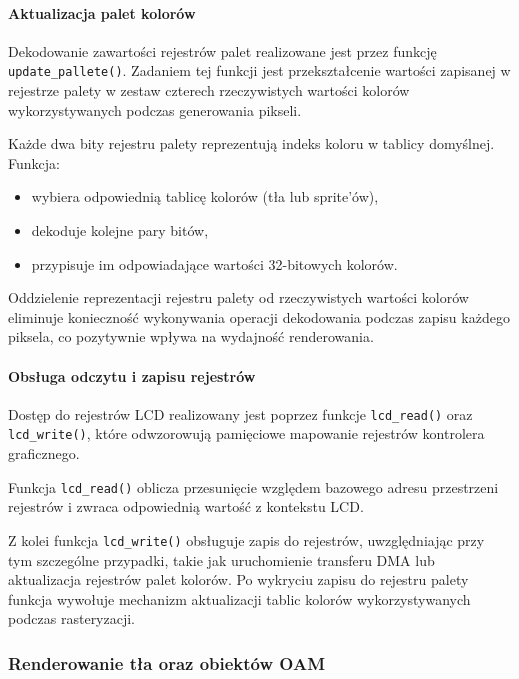 \documentclass{article}
\begin{document}
\paragraph{Aktualizacja palet kolorów}

Dekodowanie zawartości rejestrów palet realizowane jest przez funkcję \texttt{update\_pallete()}. Zadaniem tej funkcji jest przekształcenie wartości zapisanej w rejestrze palety w zestaw czterech rzeczywistych wartości kolorów wykorzystywanych podczas generowania pikseli.

Każde dwa bity rejestru palety reprezentują indeks koloru w tablicy domyślnej. Funkcja:

\begin{itemize}
	\item wybiera odpowiednią tablicę kolorów (tła lub sprite'ów),
	\item dekoduje kolejne pary bitów,
	\item przypisuje im odpowiadające wartości 32-bitowych kolorów.
\end{itemize}

Oddzielenie reprezentacji rejestru palety od rzeczywistych wartości kolorów eliminuje konieczność wykonywania operacji dekodowania podczas zapisu każdego piksela, co pozytywnie wpływa na wydajność renderowania.

\paragraph{Obsługa odczytu i zapisu rejestrów}

Dostęp do rejestrów LCD realizowany jest poprzez funkcje \texttt{lcd\_read()} oraz \texttt{lcd\_write()}, które odwzorowują pamięciowe mapowanie rejestrów kontrolera graficznego.

Funkcja \texttt{lcd\_read()} oblicza przesunięcie względem bazowego adresu przestrzeni rejestrów i zwraca odpowiednią wartość z kontekstu LCD. 

Z kolei funkcja \texttt{lcd\_write()} obsługuje zapis do rejestrów, uwzględniając przy tym szczególne przypadki, takie jak uruchomienie transferu DMA lub aktualizacja rejestrów palet kolorów. Po wykryciu zapisu do rejestru palety funkcja wywołuje mechanizm aktualizacji tablic kolorów wykorzystywanych podczas rasteryzacji.

\subsubsection{Renderowanie tła oraz obiektów OAM}
\end{document}
